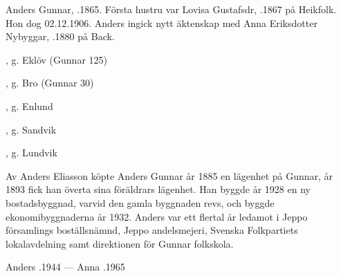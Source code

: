 %



%
Anders Gunnar, .1865. Första hustru var Lovisa Gustafsdr, .1867 på Heikfolk. Hon dog 02.12.1906. Anders ingick nytt äktenskap med Anna Eriksdotter Nybyggar, .1880 på Back.
\begin{jhchildren}
  \item {}
  \item {}
  \item {}, g. Eklöv (Gunnar 125)
  \item {}, g. Bro (Gunnar 30)
  \item {}, g. Enlund
  \item {}
  \item {}, g. Sandvik
  \item {}, g. Lundvik
  \item {}
  \item {}
  \item {}
\end{jhchildren}

Av Anders Eliasson köpte Anders Gunnar år 1885 en lägenhet på Gunnar, år 1893 fick han överta sina föräldrars lägenhet. Han byggde år 1928 en ny bostadsbyggnad, varvid den gamla byggnaden revs, och byggde ekonomibyggnaderna år 1932.	Anders var ett flertal år ledamot i Jeppo församlings boställsnämnd, Jeppo andelsmejeri, Svenska Folkpartiets lokalavdelning samt direktionen för Gunnar folkskola.

Anders .1944  ---  Anna .1965


